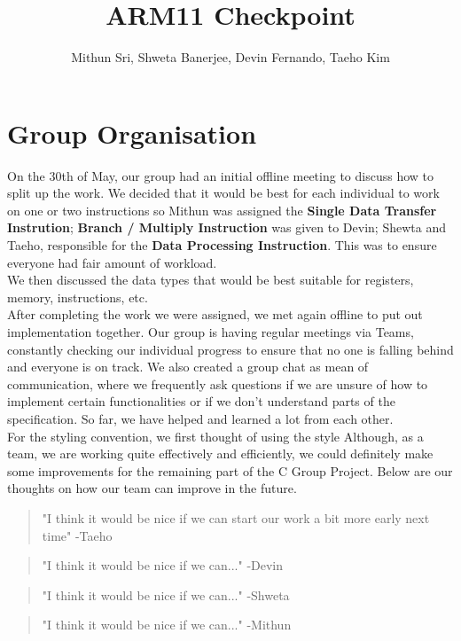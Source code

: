 \documentclass[11pt]{article}
\begin{document}
\title{ARM11 Checkpoint}
\author{Mithun Sri, Shweta Banerjee, Devin Fernando, Taeho Kim}

\maketitle

\section{Group Organisation}


\-\hspace{1cm}On the 30th of May, our group had an initial offline meeting to discuss how to split up the work. We decided that it would be best for each individual to work on one or two instructions so Mithun was assigned the {\bf Single Data Transfer Instrution}; {\bf Branch / Multiply Instruction} was given to Devin; Shewta and Taeho, responsible for the {\bf Data Processing Instruction}. This was to ensure everyone had fair amount of workload. \\
\-\hspace{1cm}We then discussed the data types that would be best suitable for registers, memory, instructions, etc. \\
\-\hspace{1cm}After completing the work we were assigned, we met again offline to put out implementation together.
\-\hspace{1cm}Our group is having regular meetings via Teams, constantly checking our individual progress to ensure that no one is falling behind and everyone is on track. We also created a group chat as mean of communication, where we frequently ask questions if we are unsure of how to implement certain functionalities or if we don't understand parts of the specification. So far, we have helped and learned a lot from each other.\\
\-\hspace{1cm}For the styling convention, we first thought of using the style 
\-\hspace{1cm}Although, as a team, we are working quite effectively and efficiently, we could definitely make some improvements for the remaining part of the C Group Project. Below are our thoughts on how our team can improve in the future.

\begin{quote}
  "I think it would be nice if we can start our work a bit more early next time" -Taeho
\end{quote}
\begin{quote}
  "I think it would be nice if we can..." -Devin
\end{quote}
\begin{quote}
  "I think it would be nice if we can..." -Shweta
\end{quote}
\begin{quote}
  "I think it would be nice if we can..." -Mithun
\end{quote}
\end{document}
